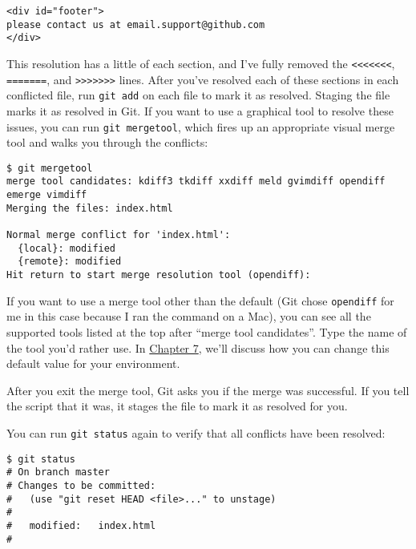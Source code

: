 \documentclass[a4paper]{book}
\newcommand{\prechap}{Chapter }
\newcommand{\postchap}{}
\newcommand{\chapref}[1]{\hyperref[chap:#1]{\prechap #1\postchap}}
\begin{document}
\begin{shaded}\begin{verbatim}
<div id="footer">
please contact us at email.support@github.com
</div>
\end{verbatim}\end{shaded}

This resolution has a little of each section, and I've fully removed the \texttt{\textless{}\textless{}\textless{}\textless{}\textless{}\textless{}\textless{}}, \texttt{=======}, and \texttt{\textgreater{}\textgreater{}\textgreater{}\textgreater{}\textgreater{}\textgreater{}\textgreater{}} lines. After you've resolved each of these sections in each conflicted file, run \texttt{git add} on each file to mark it as resolved. Staging the file marks it as resolved in Git. If you want to use a graphical tool to resolve these issues, you can run \texttt{git mergetool}, which fires up an appropriate visual merge tool and walks you through the conflicts:

\begin{shaded}\begin{verbatim}
$ git mergetool
merge tool candidates: kdiff3 tkdiff xxdiff meld gvimdiff opendiff emerge vimdiff
Merging the files: index.html

Normal merge conflict for 'index.html':
  {local}: modified
  {remote}: modified
Hit return to start merge resolution tool (opendiff):
\end{verbatim}\end{shaded}

If you want to use a merge tool other than the default (Git chose \texttt{opendiff} for me in this case because I ran the command on a Mac), you can see all the supported tools listed at the top after “merge tool candidates”. Type the name of the tool you'd rather use. In \chapref{7}, we'll discuss how you can change this default value for your environment.

After you exit the merge tool, Git asks you if the merge was successful. If you tell the script that it was, it stages the file to mark it as resolved for you.

You can run \texttt{git status} again to verify that all conflicts have been resolved:

\begin{shaded}\begin{verbatim}
$ git status
# On branch master
# Changes to be committed:
#   (use "git reset HEAD <file>..." to unstage)
#
#	modified:   index.html
#
\end{verbatim}\end{shaded}
\end{document}
